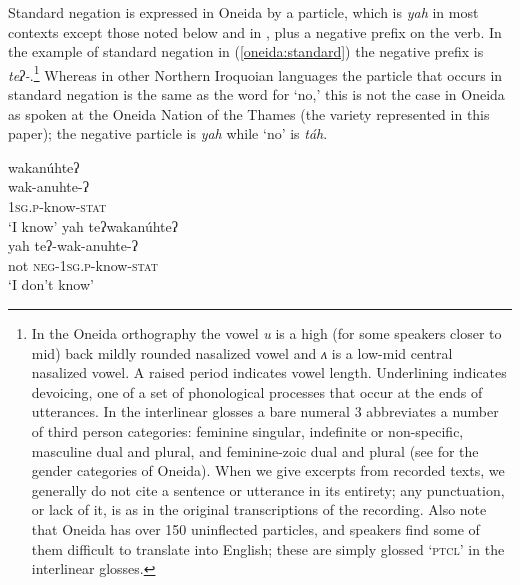 \documentclass[output=paper,colorlinks,citecolor=brown]{langscibook}
\begin{document}
Standard negation is expressed in Oneida by a particle, which is \textit{yah} in most contexts except those noted below and in , plus a negative prefix on the verb. In the example of standard negation in (\ref{oneida:standard}) the negative prefix is \mbox{\textit{teʔ-}.}\footnote{\label{oneida:fn1}In the Oneida orthography the vowel \textit{u} is a high (for some speakers closer to mid) back mildly rounded nasalized vowel and \textit{ʌ} is a low-mid central nasalized vowel. A raised period indicates vowel length. Underlining indicates devoicing, one of a set of phonological processes that occur at the ends of utterances. In the interlinear glosses a bare numeral 3 abbreviates a number of third person categories: feminine singular, indefinite or non-specific, masculine dual and plural, and feminine-zoic dual and plural (see \citealt{Michelson2015} for the gender categories of Oneida). When we give excerpts from recorded texts, we generally do not cite a sentence or utterance in its entirety; any punctuation, or lack of it, is as in the original transcriptions of the recording. Also note that Oneida has over 150 uninflected particles, and speakers find some of them difficult to translate into English; these are simply glossed `\textsc{ptcl}' in the interlinear glosses.} Whereas in other Northern Iroquoian languages the particle that occurs in standard negation is the same as the word for `no,' this is not the case in Oneida as spoken at the Oneida Nation of the Thames (the variety represented in this paper); the negative particle is \textit{yah} while `no' is \textit{táh}.

\ea\label{oneida:standard}
    \ea\label{oneida:standard a}  
        \glll wakanúhteʔ \\
        wak-anuhte-ʔ \\
        \textsc{1sg.p}-know-\textsc{stat}\\
        \glt `I know'	\citep[107]{MichelsonDoxtator2002}
    \ex\label{oneida:standard b}  
        \glll yah teʔwakanúhteʔ \\
        yah teʔ-wak-anuhte-ʔ \\
        not \textsc{neg-1sg.p}-know-\textsc{stat}\\
        \glt `I don't know'	\citep[107]{MichelsonDoxtator2002}
    \z
\z 
\end{document}
